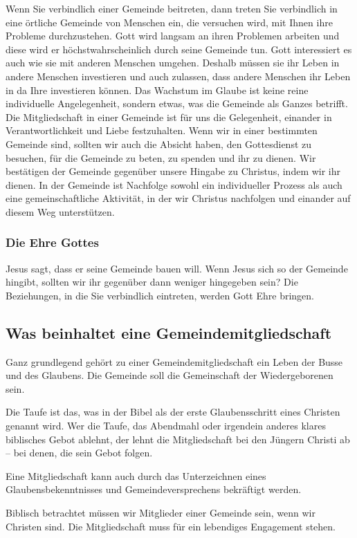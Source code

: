 \documentclass{../../inc/mybib}
\begin{document}
Wenn Sie verbindlich einer Gemeinde beitreten, dann treten Sie verbindlich in eine örtliche Gemeinde von Menschen ein, die versuchen wird, mit Ihnen ihre Probleme durchzustehen. Gott wird langsam an ihren Problemen arbeiten und diese wird er höchstwahrscheinlich durch seine Gemeinde tun. Gott interessiert es auch wie sie mit anderen Menschen umgehen. Deshalb müssen sie ihr Leben in andere Menschen investieren und auch zulassen, dass andere Menschen ihr Leben in da Ihre investieren können. Das Wachstum im Glaube ist keine reine individuelle Angelegenheit, sondern etwas, was die Gemeinde als Ganzes betrifft. Die Mitgliedschaft in einer Gemeinde ist für uns die Gelegenheit, einander in Verantwortlichkeit und Liebe festzuhalten. Wenn wir in einer bestimmten Gemeinde sind, sollten wir auch die Absicht haben, den Gottesdienst zu besuchen, für die Gemeinde zu beten, zu spenden und ihr zu dienen. Wir bestätigen der Gemeinde gegenüber unsere Hingabe zu Christus, indem wir ihr dienen. In der Gemeinde ist Nachfolge sowohl ein individueller Prozess als auch eine gemeinschaftliche Aktivität, in der wir Christus nachfolgen und einander auf diesem Weg unterstützen.
\subsubsection{Die Ehre Gottes}
Jesus sagt, dass er seine Gemeinde bauen will. Wenn Jesus sich so der Gemeinde hingibt, sollten wir ihr gegenüber dann weniger hingegeben sein? Die Beziehungen, in die Sie verbindlich eintreten, werden Gott Ehre bringen.
\subsection{Was beinhaltet eine Gemeindemitgliedschaft}
Ganz grundlegend gehört zu einer Gemeindemitgliedschaft ein Leben der Busse und des Glaubens. Die Gemeinde soll die Gemeinschaft der Wiedergeborenen sein.

Die Taufe ist das, was in der Bibel als der erste Glaubensschritt eines Christen genannt wird. Wer die Taufe, das Abendmahl oder irgendein anderes klares biblisches Gebot ablehnt, der lehnt die Mitgliedschaft bei den Jüngern Christi ab -- bei denen, die sein Gebot folgen.

Eine Mitgliedschaft kann auch durch das Unterzeichnen eines Glaubensbekenntnisses und Gemeindeversprechens bekräftigt werden.

Biblisch betrachtet müssen wir Mitglieder einer Gemeinde sein, wenn wir Christen sind. Die Mitgliedschaft muss für ein lebendiges Engagement stehen.
\end{document}
